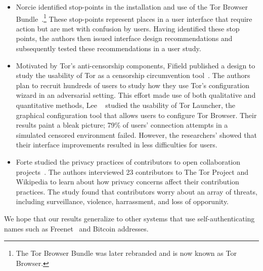 \begin{itemize}
    \item Norcie \ea identified stop-points in the installation and use
        of the Tor Browser Bundle~\cite{Norcie2014a}.\footnote{The Tor Browser
        Bundle was later rebranded and is now known as Tor Browser.}  These
        stop-points represent places in a user interface that require action
        but are met with confusion by users.  Having identified these stop
        points, the authors then issued interface design recommendations and
        subsequently tested these recommendations in a user study.

    \item Motivated by Tor's anti-censorship components, Fifield \ea published
        a design to study the usability of Tor as a censorship circumvention
        tool~\cite{Fifield2015a}.  The authors plan to recruit hundreds of
        users to study how they use Tor's configuration wizard in an
        adversarial setting.  This effort made use of both qualitative and
        quantitative methods, Lee \ea~\cite{Lee2017a} studied the usability of
        Tor Launcher, the graphical configuration tool that allows users to
        configure Tor Browser.  Their results paint a bleak picture; 79\% of
        users' connection attempts in a simulated censored environment failed.
        However, the researchers' showed that their interface improvements
        resulted in less difficulties for users.

    \item Forte \ea studied the privacy practices of contributors to open
        collaboration projects~\cite{Forte2017a}.  The authors interviewed 23
        contributors to The Tor Project and Wikipedia to learn about how
        privacy concerns affect their contribution practices.  The study found
        that contributors worry about an array of threats, including
        surveillance, violence, harrassment, and loss of opporunity.

\end{itemize}

We hope that our results generalize to other systems that use
self-authenticating names such as Freenet~\cite{Freenet} and Bitcoin addresses.
